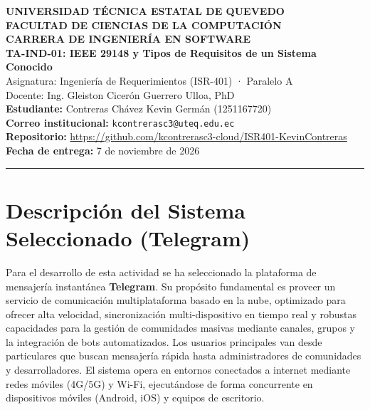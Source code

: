 \documentclass[11pt,a4paper]{article}
\begin{document}
\begin{center}
    {\Large \textbf{UNIVERSIDAD TÉCNICA ESTATAL DE QUEVEDO}} \\[0.2cm]
    {\large \textbf{FACULTAD DE CIENCIAS DE LA COMPUTACIÓN}} \\[0.2cm]
    {\large \textbf{CARRERA DE INGENIERÍA EN SOFTWARE}} \\[0.5cm]
    
    \vspace{0.3cm}
    {\Large \textbf{TA-IND-01: IEEE 29148 y Tipos de Requisitos de un Sistema Conocido}} \\[0.2cm]
    {\large Asignatura: Ingeniería de Requerimientos (ISR-401) · Paralelo A} \\[0.2cm]
    {\large Docente: Ing. Gleiston Cicerón Guerrero Ulloa, PhD} \\[0.4cm]
    
    \textbf{Estudiante:} Contreras Chávez Kevin Germán (1251167720) \\
    \textbf{Correo institucional:} \texttt{kcontrerasc3@uteq.edu.ec} \\
    \textbf{Repositorio:} \url{https://github.com/kcontrerasc3-cloud/ISR401-KevinContreras} \\
    \textbf{Fecha de entrega:} 7 de noviembre de 2026
\end{center}

\rule{\textwidth}{0.4pt}
\vspace{0.4cm}

\section{Descripción del Sistema Seleccionado (Telegram)}
Para el desarrollo de esta actividad se ha seleccionado la plataforma de mensajería instantánea \textbf{Telegram}. Su propósito fundamental es proveer un servicio de comunicación multiplataforma basado en la nube, optimizado para ofrecer alta velocidad, sincronización multi-dispositivo en tiempo real y robustas capacidades para la gestión de comunidades masivas mediante canales, grupos y la integración de bots automatizados. Los usuarios principales van desde particulares que buscan mensajería rápida hasta administradores de comunidades y desarrolladores. El sistema opera en entornos conectados a internet mediante redes móviles (4G/5G) y Wi-Fi, ejecutándose de forma concurrente en dispositivos móviles (Android, iOS) y equipos de escritorio.
\end{document}
